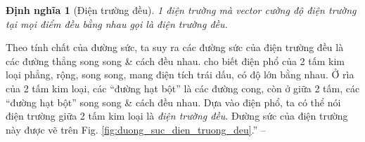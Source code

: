 \documentclass[oneside]{book}
\numberwithin{equation}{section}
\newtheorem{dinhnghia}{Định nghĩa}[section]
\begin{document}
\begin{dinhnghia}[Điện trường đều]
	1 điện trường mà vector cường độ điện trường tại mọi điểm đều bằng nhau gọi là \emph{điện trường đều}.
\end{dinhnghia}
Theo tính chất của đường sức, ta suy ra các đường sức của điện trường đều là các đường thẳng song song \& cách đều nhau. \cite[Hình 3.7: \textsf{Điện phổ của điện trường ở giữa 2 tấm kim loại phẳng, rộng, song song, mang điện tích trái dấu, có độ lớn bằng nhau}, p. 16]{SGK_Vat_Ly_11_nang_cao} cho biết điện phổ của 2 tấm kim loại phẳng, rộng, song song, mang điện tích trái dấu, có độ lớn bằng nhau. Ở rìa của 2 tấm kim loại, các ``đường hạt bột'' là các đường cong, còn ở giữa 2 tấm, các ``đường hạt bột'' song song \& cách đều nhau. Dựa vào điện phổ, ta có thể nói điện trường giữa 2 tấm kim loại là \textit{điện trường đều}. Đường sức của điện trường này được vẽ trên Fig. \ref{fig:duong_suc_dien_truong_deu}.'' -- \cite[p. 16]{SGK_Vat_Ly_11_nang_cao}
\end{document}
